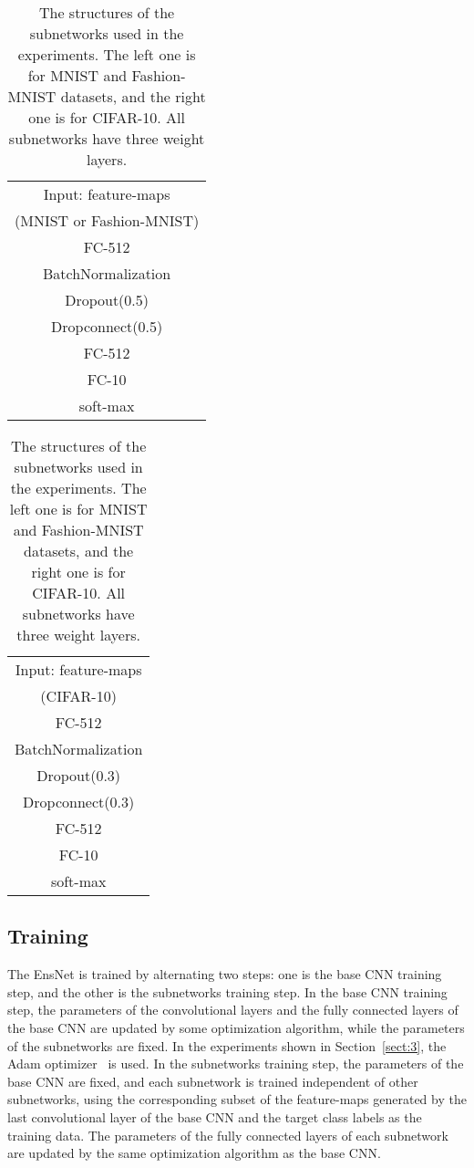 \documentclass[a4j]{article}
\begin{document}
\begin{table}[t]
  \centering
\caption{The structures of the subnetworks used in the experiments. The left one is for MNIST and Fashion-MNIST datasets, and the right one is for CIFAR-10. All subnetworks have three weight layers.}
  \label{tb:subnet}
  \begin{tabular}[t]{|c|} \hline
      Input:  feature-maps \\ (MNIST or Fashion-MNIST) \\ \hline
      FC-512\\
      BatchNormalization\\
      Dropout(0.5)\\ \hline
      Dropconnect(0.5)\\
      FC-512\\ \hline
      FC-10\\ \hline
      soft-max\\ \hline
\end{tabular}
  \begin{tabular}[t]{|c|} \hline
      Input:  feature-maps \\ (CIFAR-10)\\ \hline
      FC-512\\
      BatchNormalization\\
      Dropout(0.3)\\ \hline
      Dropconnect(0.3)\\
      FC-512\\ \hline
      FC-10\\ \hline
      soft-max\\ \hline
\end{tabular}
\end{table}

\subsection{Training}
The EnsNet is trained by alternating two steps: one is the base CNN training step, and the other is the subnetworks training step. In the base CNN training step, the parameters of the convolutional layers and the fully connected layers of the base CNN are updated by some optimization algorithm, while the parameters of the subnetworks are fixed. In the experiments shown in Section~\ref{sect:3}, the Adam optimizer~\cite{Adam} is used. In the subnetworks training step, the parameters of the base CNN are fixed, and each subnetwork is trained independent of other subnetworks, using the corresponding subset of the feature-maps generated by the last convolutional layer of the base CNN and the target class labels as the training data. The parameters of the fully connected layers of each subnetwork are updated by the same optimization algorithm as the base CNN.
\end{document}
